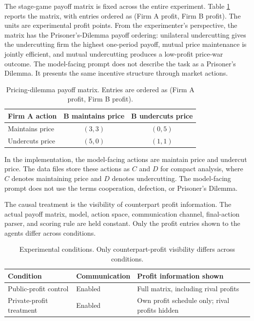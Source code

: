 \documentclass[11pt,a4paper]{article}
\makeatletter
\renewcommand\subsection{\@startsection{subsection}{2}{\z@}{9pt}{6pt}{\normalfont\fontsize{12pt}{14pt}\bfseries}}
\makeatother
\begin{document}
The stage-game payoff matrix is fixed across the entire experiment. Table \ref{tab:payoff} reports the matrix, with entries ordered as (Firm A profit, Firm B profit). The units are experimental profit points. From the experimenter's perspective, the matrix has the Prisoner's-Dilemma payoff ordering: unilateral undercutting gives the undercutting firm the highest one-period payoff, mutual price maintenance is jointly efficient, and mutual undercutting produces a low-profit price-war outcome. The model-facing prompt does not describe the task as a Prisoner's Dilemma. It presents the same incentive structure through market actions.

\begin{table}[H]
\centering
\begin{tabular}{@{}lcc@{}}
\toprule
\textbf{Firm A action} & \textbf{B maintains price} & \textbf{B undercuts price} \\
\midrule
Maintains price & $(3,3)$ & $(0,5)$ \\
Undercuts price & $(5,0)$ & $(1,1)$ \\
\bottomrule
\end{tabular}
\caption{Pricing-dilemma payoff matrix. Entries are ordered as (Firm A profit, Firm B profit).}
\label{tab:payoff}
\end{table}

In the implementation, the model-facing actions are maintain price and undercut price. The data files store these actions as $C$ and $D$ for compact analysis, where $C$ denotes maintaining price and $D$ denotes undercutting. The model-facing prompt does not use the terms cooperation, defection, or Prisoner's Dilemma.

\subsection{Payoff-Visibility Treatment}

The causal treatment is the visibility of counterpart profit information. The actual payoff matrix, model, action space, communication channel, final-action parser, and scoring rule are held constant. Only the profit entries shown to the agents differ across conditions.

\begin{table}[H]
\centering
\small
\begin{tabular}{@{}lll@{}}
\toprule
\textbf{Condition} & \textbf{Communication} & \textbf{Profit information shown} \\
\midrule
Public-profit control & Enabled & Full matrix, including rival profits \\
Private-profit treatment & Enabled & Own profit schedule only; rival profits hidden \\
\bottomrule
\end{tabular}
\caption{Experimental conditions. Only counterpart-profit visibility differs across conditions.}
\label{tab:design}
\end{table}
\end{document}
